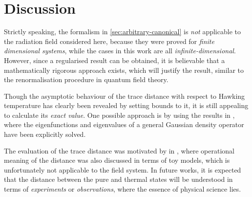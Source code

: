 \section{Discussion}
\label{sec:dist-discussion}
Strictly speaking, the formalism in \cref{sec:arbitrary-canonical} is \emph{not}
applicable to the radiation field considered here, because they were proved for 
\emph{finite dimensional systems}, while the cases in this work are all 
\emph{infinite-dimensional}. However, since a regularised result can be 
obtained, it is believable that a mathematically rigorous approach exists, which 
will justify the result, similar to the renormalisation procedure in quantum 
field theory.

Though the asymptotic behaviour of the trace distance with respect to Hawking 
temperature has clearly been revealed by setting bounds to it, it is still 
appealing to calculate its \emph{exact value}. One possible approach is by 
using the results in \cite{Joos1985}, where the eigenfunctions and eigenvalues 
of a general Gaussian density operator have been explicitly solved.

The evaluation of the trace distance was motivated by \citeauthor{Hsu2009} in 
\cite{Hsu2009}, where operational meaning of the distance was also discussed in 
terms of toy models, which is unfortunately not applicable to the field system. 
In future works, it is expected that the distance between the pure and thermal 
states will be understood in terms of \emph{experiments} or \emph{observations}, 
where the essence of physical science lies.


